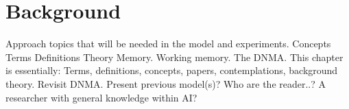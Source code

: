 
\chapter{Background}\label{chpt:background}

Approach topics that will be needed in the model and experiments.
Concepts
Terms
Definitions
Theory
Memory. Working memory.
The DNMA.
This chapter is essentially: Terms, definitions, concepts, papers, contemplations, background theory. Revisit DNMA.
Present previous model(s)?
Who are the reader..? A researcher with general knowledge within AI?


\cleardoublepage